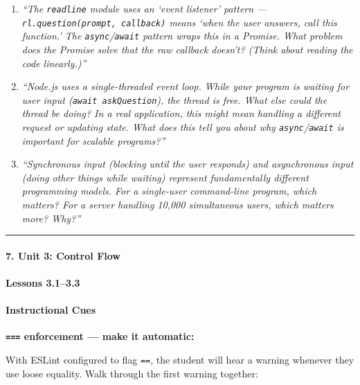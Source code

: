 \documentclass[
  justified,
  openright,
]{tufte-book}
\let\subsection\paragraph
\let\paragraph\paragraph
\let\subsection\paragraph
\let\paragraph\paragraph
\begin{document}
\begin{enumerate}
\def\labelenumi{\arabic{enumi}.}
\item
  \emph{``The \texttt{readline} module uses an `event listener' pattern
  --- \texttt{rl.question(prompt,\ callback)} means `when the user
  answers, call this function.' The \texttt{async}/\texttt{await}
  pattern wraps this in a Promise. What problem does the Promise solve
  that the raw callback doesn't? (Think about reading the code
  linearly.)''}
\item
  \emph{``Node.js uses a single-threaded event loop. While your program
  is waiting for user input (\texttt{await\ askQuestion}), the thread is
  free. What else could the thread be doing? In a real application, this
  might mean handling a different request or updating state. What does
  this tell you about why \texttt{async}/\texttt{await} is important for
  scalable programs?''}
\item
  \emph{``Synchronous input (blocking until the user responds) and
  asynchronous input (doing other things while waiting) represent
  fundamentally different programming models. For a single-user
  command-line program, which matters? For a server handling 10,000
  simultaneous users, which matters more? Why?''}
\end{enumerate}

\begin{center}\rule{0.5\linewidth}{0.5pt}\end{center}

\subsection{7. Unit 3: Control Flow}\label{unit-3-control-flow}

\subsection{Lessons 3.1--3.3}\label{lessons-3.13.3}

\paragraph{Instructional Cues}\label{instructional-cues-14}

\textbf{\texttt{===} enforcement --- make it automatic:}

With ESLint configured to flag \texttt{==}, the student will hear a
warning whenever they use loose equality. Walk through the first warning
together:
\end{document}
